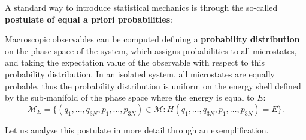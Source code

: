 A standard way to introduce statistical mechanics is through the so-called \textbf{postulate of equal a priori probabilities}:
\begin{postulate}
    Macroscopic observables can be computed defining a \textbf{probability distribution} on the phase space of the system, which assigns probabilities to all microstates, and taking the expectation value of the observable with respect to this probability distribution. In an isolated system, all microstates are equally probable, thus the probability distribution is uniform on the energy shell defined by the sub-manifold of the phase space where the energy is equal to \(E\):
    \[
        \mathcal{M}_E = \{ (q_1, \ldots, q_{3N}, p_1, \ldots, p_{3N}) \in \mathcal{M} : H(q_1, \ldots, q_{3N}, p_1, \ldots, p_{3N}) = E \}.
    \]
\end{postulate}
Let us analyze this postulate in more detail through an exemplification.

